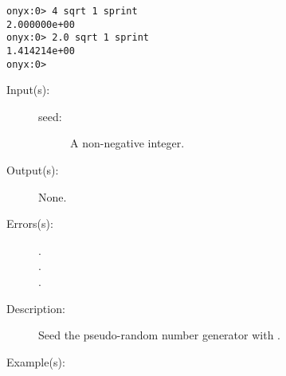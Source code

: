 \begin{description}
\begin{description}
\begin{verbatim}
onyx:0> 4 sqrt 1 sprint
2.000000e+00
onyx:0> 2.0 sqrt 1 sprint
1.414214e+00
onyx:0>
		\end{verbatim}
	\end{description}
\label{systemdict:srand}
\item[{\onyxop{seed}{srand}{--}}: ]
	\begin{description}\item[]
	\item[Input(s): ]
		\begin{description}\item[]
		\item[seed: ]
			A non-negative integer.
		\end{description}
	\item[Output(s): ] None.
	\item[Errors(s): ]
		\begin{description}\item[]
		\item[.]
		\item[.]
		\item[.]
		\end{description}
	\item[Description: ]
		Seed the pseudo-random number generator with .
	\item[Example(s): ]\begin{verbatim}


\end{verbatim}
\end{description}
\end{description}
